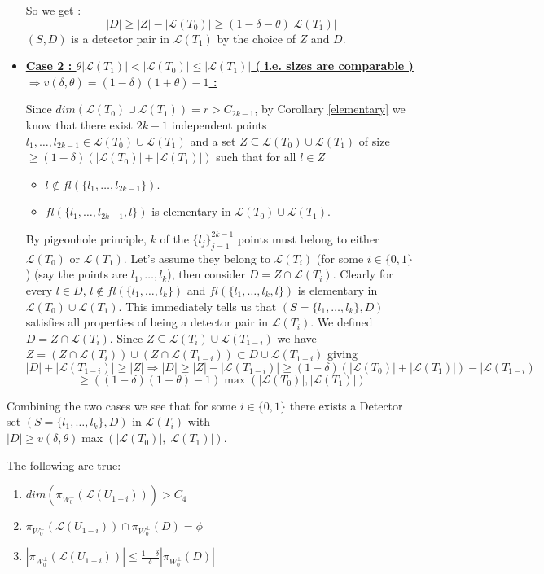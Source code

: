 \documentclass[letterpaper,USenglish,numberwithinsect]{lipics}
\newcommand{\ML}{\mathcal{L}}
\begin{document}
\begin{itemize}
So we get :
\[
 |D|\geq |Z|-|\ML(T_{0})|\geq (1-\delta-\theta)|\ML(T_1)|
\]
$(S,D)$ is a detector pair in $\ML(T_1)$ by the choice of $Z$ and $D$.
  \item \underline{{\bf Case 2 : $\theta |\ML(T_1)| < |\ML(T_0)| \leq |\ML(T_1)|$ ( i.e.
sizes are comparable ) $\Rightarrow v(\delta,\theta) = (1-\delta)(1+\theta)-1$ : }}

Since $dim(\ML(T_0)\cup \ML(T_{1})) = r > C_{2k-1}$, by Corollary \ref{elementary} we know that
there exist $2k-1$ independent points $l_1,\ldots,l_{2k-1} \in \ML(T_0)\cup
\ML(T_{1})$ and
a set $Z\subseteq \ML(T_0)\cup \ML(T_{1})$ of size $\geq
(1-\delta)(|\ML(T_0)|+|\ML(T_{1})|) $ such that for
all $l\in Z$
\begin{itemize}
 \item $l\notin fl(\{l_1,\ldots,l_{2k-1}\})$.
 \item $fl(\{l_1,\ldots,l_{2k-1}, l\})$ is elementary in $\ML(T_0)\cup
\ML(T_{1})$.
\end{itemize}

By pigeonhole principle, $k$ of the $\{l_j\}_{j=1}^{2k-1}$ points must belong to
either $\ML(T_0)$ or
$\ML(T_{1})$. Let's assume they belong to $\ML(T_i)$ (for some $i\in \{0,1\}$)
(say the points are $l_{1},\ldots,l_{k}$), then consider $D = Z\cap \ML(T_i)$.
Clearly for every
$l\in D$, $l\notin fl(\{l_{1},\ldots,l_{k}\})$ and
$fl(\{l_{1},\ldots,l_{k},l\})$ is elementary
in $\ML(T_0)
\cup \ML(T_{1})$. This immediately tells us that
$(S = \{l_{1},\ldots,l_{k}\},D)$ satisfies all properties of being a
detector pair in $\ML(T_i)$. We defined $D = Z\cap \ML(T_i)$. Since $Z\subseteq \ML(T_i)\cup \ML(T_{1-i})$ we have
$Z = (Z\cap \ML(T_i))\cup (Z\cap \ML(T_{1-i})) \subset D \cup \ML(T_{1-i})$ giving
\[
|D| + |\ML(T_{1-i})| \geq |Z| \Rightarrow |D| \geq |Z| - |\ML(T_{1-i})|\geq
(1-\delta)(|\ML(T_0)|+|\ML(T_{1})|)-|\ML(T_{1-i})|
\]
\[
\geq
((1-\delta)(1+\theta)-1)\max(|\ML(T_0)|,|\ML(T_1)|)
 \]

 \end{itemize}

 Combining the two cases we see that for some $i\in \{0,1\}$ there exists a Detector set
$(S=\{l_{1},\ldots,l_{k}\},D)$ in $\ML(T_i)$  with
$|D|\geq v(\delta,\theta) \max(|\ML(T_{0})|,|\ML(T_{1})|)$.







\begin{lemma}\label{findreconstructorproof}
The following are true:
\begin{enumerate}
 \item $dim(\pi_{W_0^\perp}({\ML(U_{1-i})}))> C_4$
 \item $\pi_{W_0^\perp}({\ML(U_{1-i})})\cap \pi_{W_0^\perp}({D}) = \phi$
 \item $|\pi_{W_0^\perp}({\ML(U_{1-i})})| \leq
\frac{1-\delta}{\delta}|\pi_{W_0^\perp}({D})|$
\end{enumerate}
\end{lemma}
\end{document}
